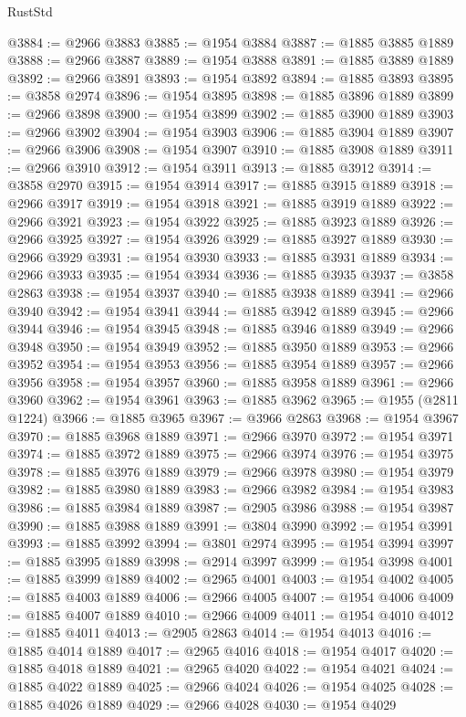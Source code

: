 \begin{lexlean}{RustStd}
\begin{coremodule}
@3884 := @2966 @3883
@3885 := @1954 @3884
@3887 := @1885 @3885 @1889
@3888 := @2966 @3887
@3889 := @1954 @3888
@3891 := @1885 @3889 @1889
@3892 := @2966 @3891
@3893 := @1954 @3892
@3894 := @1885 @3893
@3895 := @3858 @2974
@3896 := @1954 @3895
@3898 := @1885 @3896 @1889
@3899 := @2966 @3898
@3900 := @1954 @3899
@3902 := @1885 @3900 @1889
@3903 := @2966 @3902
@3904 := @1954 @3903
@3906 := @1885 @3904 @1889
@3907 := @2966 @3906
@3908 := @1954 @3907
@3910 := @1885 @3908 @1889
@3911 := @2966 @3910
@3912 := @1954 @3911
@3913 := @1885 @3912
@3914 := @3858 @2970
@3915 := @1954 @3914
@3917 := @1885 @3915 @1889
@3918 := @2966 @3917
@3919 := @1954 @3918
@3921 := @1885 @3919 @1889
@3922 := @2966 @3921
@3923 := @1954 @3922
@3925 := @1885 @3923 @1889
@3926 := @2966 @3925
@3927 := @1954 @3926
@3929 := @1885 @3927 @1889
@3930 := @2966 @3929
@3931 := @1954 @3930
@3933 := @1885 @3931 @1889
@3934 := @2966 @3933
@3935 := @1954 @3934
@3936 := @1885 @3935
@3937 := @3858 @2863
@3938 := @1954 @3937
@3940 := @1885 @3938 @1889
@3941 := @2966 @3940
@3942 := @1954 @3941
@3944 := @1885 @3942 @1889
@3945 := @2966 @3944
@3946 := @1954 @3945
@3948 := @1885 @3946 @1889
@3949 := @2966 @3948
@3950 := @1954 @3949
@3952 := @1885 @3950 @1889
@3953 := @2966 @3952
@3954 := @1954 @3953
@3956 := @1885 @3954 @1889
@3957 := @2966 @3956
@3958 := @1954 @3957
@3960 := @1885 @3958 @1889
@3961 := @2966 @3960
@3962 := @1954 @3961
@3963 := @1885 @3962
@3965 := @1955 (@2811 @1224)
@3966 := @1885 @3965
@3967 := @3966 @2863
@3968 := @1954 @3967
@3970 := @1885 @3968 @1889
@3971 := @2966 @3970
@3972 := @1954 @3971
@3974 := @1885 @3972 @1889
@3975 := @2966 @3974
@3976 := @1954 @3975
@3978 := @1885 @3976 @1889
@3979 := @2966 @3978
@3980 := @1954 @3979
@3982 := @1885 @3980 @1889
@3983 := @2966 @3982
@3984 := @1954 @3983
@3986 := @1885 @3984 @1889
@3987 := @2905 @3986
@3988 := @1954 @3987
@3990 := @1885 @3988 @1889
@3991 := @3804 @3990
@3992 := @1954 @3991
@3993 := @1885 @3992
@3994 := @3801 @2974
@3995 := @1954 @3994
@3997 := @1885 @3995 @1889
@3998 := @2914 @3997
@3999 := @1954 @3998
@4001 := @1885 @3999 @1889
@4002 := @2965 @4001
@4003 := @1954 @4002
@4005 := @1885 @4003 @1889
@4006 := @2966 @4005
@4007 := @1954 @4006
@4009 := @1885 @4007 @1889
@4010 := @2966 @4009
@4011 := @1954 @4010
@4012 := @1885 @4011
@4013 := @2905 @2863
@4014 := @1954 @4013
@4016 := @1885 @4014 @1889
@4017 := @2965 @4016
@4018 := @1954 @4017
@4020 := @1885 @4018 @1889
@4021 := @2965 @4020
@4022 := @1954 @4021
@4024 := @1885 @4022 @1889
@4025 := @2966 @4024
@4026 := @1954 @4025
@4028 := @1885 @4026 @1889
@4029 := @2966 @4028
@4030 := @1954 @4029

\end{coremodule}
\end{lexlean}
